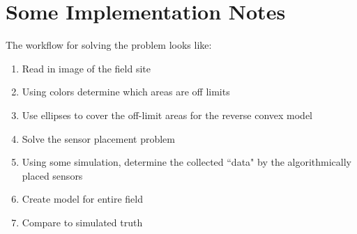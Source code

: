 \section{Some Implementation Notes}
The workflow for solving the problem looks like:
\begin{enumerate}
\item Read in image of the field site
\item Using colors determine which areas are off limits
\item Use ellipses to cover the off-limit areas for the reverse convex model
\item Solve the sensor placement problem 
\item Using some simulation, determine the collected ``data" by the algorithmically placed sensors
\item Create model for entire field
\item Compare to simulated truth
\end{enumerate}
